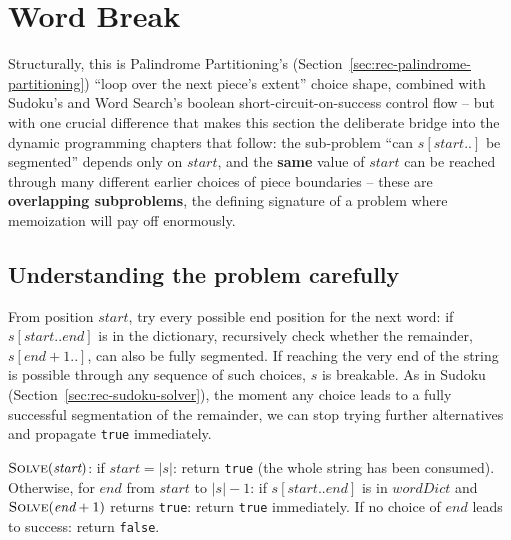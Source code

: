 \section{Word Break}
\label{sec:rec-word-break}


\begin{patternbox}
Structurally, this is Palindrome Partitioning's
(Section~\ref{sec:rec-palindrome-partitioning}) ``loop over the next
piece's extent'' choice shape, combined with Sudoku's and Word Search's
boolean short-circuit-on-success control flow -- but with one crucial
difference that makes this section the deliberate bridge into the
dynamic programming chapters that follow: the sub-problem
``can $s[\textit{start}..]$ be segmented'' depends only on
$\textit{start}$, and the \textbf{same} value of $\textit{start}$ can be
reached through many different earlier choices of piece boundaries --
these are \textbf{overlapping subproblems}, the defining signature of a
problem where memoization will pay off enormously.
\end{patternbox}

\subsection*{Understanding the problem carefully}

From position $\textit{start}$, try every possible end position for the
next word: if $s[\textit{start}..\textit{end}]$ is in the dictionary,
recursively check whether the remainder, $s[\textit{end}+1..]$, can also
be fully segmented. If reaching the very end of the string is possible
through any sequence of such choices, $s$ is breakable. As in Sudoku
(Section~\ref{sec:rec-sudoku-solver}), the moment any choice leads to a
fully successful segmentation of the remainder, we can stop trying
further alternatives and propagate \texttt{true} immediately.

\begin{ideabox}
$\textsc{Solve}(\textit{start})$: if $\textit{start} = |s|$: return
\texttt{true} (the whole string has been consumed). Otherwise, for
$\textit{end}$ from $\textit{start}$ to $|s|-1$: if
$s[\textit{start}..\textit{end}]$ is in $\textit{wordDict}$ and
$\textsc{Solve}(\textit{end}+1)$ returns \texttt{true}: return
\texttt{true} immediately. If no choice of $\textit{end}$ leads to
success: return \texttt{false}.
\end{ideabox}

